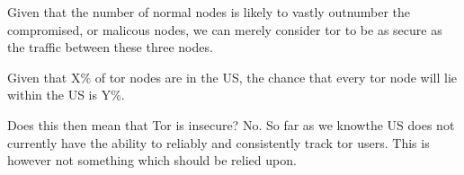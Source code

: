 Given that the number of normal nodes is likely to vastly outnumber the
compromised, or malicous nodes, we can merely consider tor to be as secure as
the traffic between these three nodes.

Given that X\% of tor nodes are in the US, the chance that every tor
node will lie within the US is Y\%.

Does this then mean that Tor is insecure? No. So far as we knowthe US does not currently have the ability to reliably and
consistently track tor users. This is however not something which should be
relied upon.

